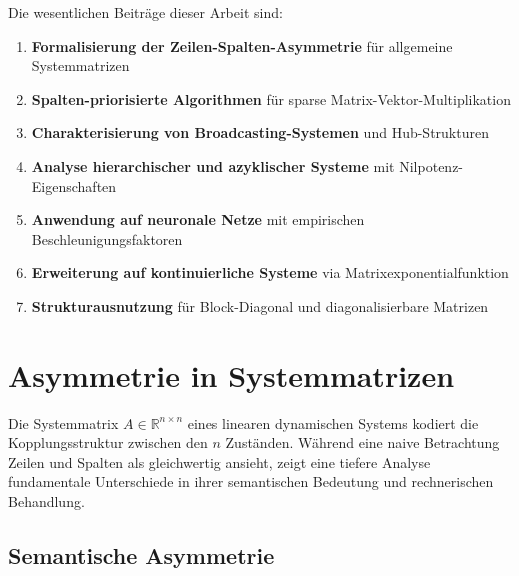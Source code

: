 \documentclass[a4paper,12pt]{report}
\theoremstyle{definition}
\begin{document}
	Die wesentlichen Beiträge dieser Arbeit sind:
	
	\begin{enumerate}
		\item \textbf{Formalisierung der Zeilen-Spalten-Asymmetrie} für allgemeine Systemmatrizen
		\item \textbf{Spalten-priorisierte Algorithmen} für sparse Matrix-Vektor-Multiplikation
		\item \textbf{Charakterisierung von Broadcasting-Systemen} und Hub-Strukturen
		\item \textbf{Analyse hierarchischer und azyklischer Systeme} mit Nilpotenz-Eigenschaften
		\item \textbf{Anwendung auf neuronale Netze} mit empirischen Beschleunigungsfaktoren
		\item \textbf{Erweiterung auf kontinuierliche Systeme} via Matrixexponentialfunktion
		\item \textbf{Strukturausnutzung} für Block-Diagonal und diagonalisierbare Matrizen
	\end{enumerate}
	
	\chapter{Asymmetrie in Systemmatrizen}
	
	Die Systemmatrix $A \in \mathbb{R}^{n \times n}$ eines linearen dynamischen Systems kodiert die Kopplungsstruktur zwischen den $n$ Zuständen. Während eine naive Betrachtung Zeilen und Spalten als gleichwertig ansieht, zeigt eine tiefere Analyse fundamentale Unterschiede in ihrer semantischen Bedeutung und rechnerischen Behandlung.
	
	\section{Semantische Asymmetrie}
	
\end{document}
